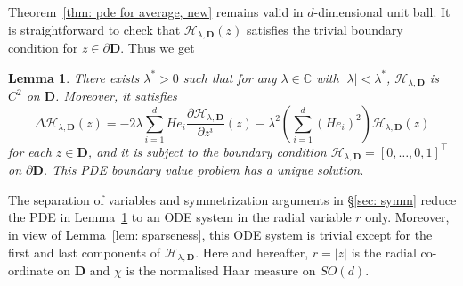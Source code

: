 \documentclass[11pt,a4paper,english,reqno]{amsart}
\theoremstyle{plain}
\newtheorem{lemma}[definition]{Lemma}
\newcommand{\C}{\mathbb{C}}
\newcommand{\1}{\mathbbm{1}}
\begin{document}

Theorem~\ref{thm: pde for average, new} remains valid in $d$-dimensional unit ball. It is straightforward to check that  $\mathcal{H}_{\lambda, \mathbf{D}}(z)$ satisfies the trivial boundary condition for $z \in \partial \mathbf{D}$.  Thus we get

\begin{lemma}\label{lem: PDE_H_d_ball}
There exists $\lambda^* >0$ such that for any $\lambda \in \C$ with $|\lambda| < \lambda^*$, $\mathcal{H}_{\lambda, \mathbf{D}}$ is $C^2$ on $\mathbf{D}$. Moreover, it satisfies
\begin{equation*}
\Delta \mathcal{H}_{\lambda, \mathbf{D}}(z)=-2\lambda\sum_{i=1}^{d}He_{i}\frac{\partial \mathcal{H}_{\lambda, \mathbf{D}}}{\partial z^{i}}(z)-\lambda^{2}\left(\sum_{i=1}^{d}\left(He_{i}\right)^{2}\right)\mathcal{H}_{\lambda, \mathbf{D}}(z)
\end{equation*}
for each $z \in \mathbf{D}$, and it is subject to the boundary condition $\mathcal{H}_{\lambda, \mathbf{D}} = [0,\ldots, 0, 1]^{\top}$ on $\partial \mathbf{D}$. This PDE boundary value problem has a unique solution.
\end{lemma}


The separation of variables and symmetrization arguments in \S\ref{sec: symm} reduce the PDE in Lemma~\ref{lem: PDE_H_d_ball} to an ODE system in the radial variable $r$ only. Moreover, in view of Lemma~\ref{lem: sparseness}, this  ODE system is trivial except for the first and last components of $\mathcal{H}_{\lambda, \mathbf{D}}$. Here and hereafter, $r=|z|$ is the radial co-ordinate on $\mathbf{D}$ and $\chi$ is the normalised Haar measure on $SO(d)$.
\end{document}
